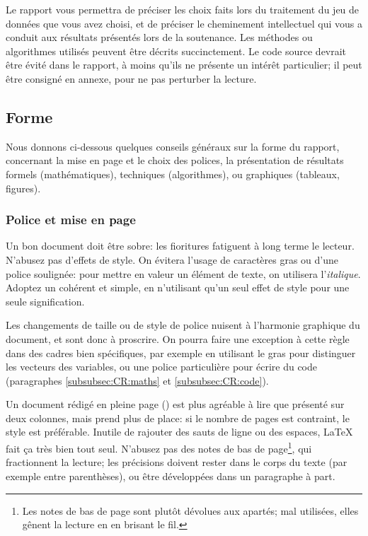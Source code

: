 \documentclass[twocolumn,10pt]{article}
\begin{document}
Le rapport vous permettra de préciser les choix faits lors du traitement du jeu de données que vous avez choisi, et de préciser le cheminement intellectuel qui vous a conduit aux résultats présentés lors de la soutenance. Les méthodes ou algorithmes utilisés peuvent être décrits succinctement. Le code source devrait être évité dans le rapport, à moins qu'ils ne présente un intérêt particulier; il peut être consigné en annexe, pour ne pas perturber la lecture. 



\subsection{Forme}\label{subsec:CR:forme}

Nous donnons ci-dessous quelques conseils généraux sur la forme du rapport, concernant la mise en page et le choix des polices, la présentation de résultats formels (mathématiques), techniques (algorithmes), ou graphiques (tableaux, figures). 



\subsubsection{Police et mise en page}\label{subsubsec:CR:miseenpage}

Un bon document doit être sobre: les fioritures fatiguent à long terme le lecteur. N'abusez pas d'effets de style. On évitera l'usage de caractères gras ou d'une police soulignée: pour mettre en valeur un élément de texte, on utilisera l'\emph{italique}. Adoptez un  cohérent et simple, en n'utilisant qu'un seul effet de style pour une seule signification. 

Les changements de taille ou de style de police nuisent à l'harmonie graphique du document, et sont donc à proscrire. On pourra faire une exception à cette règle dans des cadres bien spécifiques, par exemple en utilisant le gras pour distinguer les vecteurs des variables, ou une police particulière pour écrire du code (paragraphes \ref{subsubsec:CR:maths} et \ref{subsubsec:CR:code}). 

Un document rédigé en pleine page () est plus agréable à lire que présenté sur deux colonnes, mais prend plus de place: si le nombre de pages est contraint, le style  est préférable. 
Inutile de rajouter des sauts de ligne ou des espaces, \LaTeX{} fait ça très bien tout seul. N'abusez pas des notes de bas de page\footnote{Les notes de bas de page sont plutôt dévolues aux apartés; mal utilisées, elles gênent la lecture en en brisant le fil.}, qui fractionnent la lecture; les précisions doivent rester dans le corps du texte (par exemple entre parenthèses), ou être développées dans un paragraphe à part. 
\end{document}
